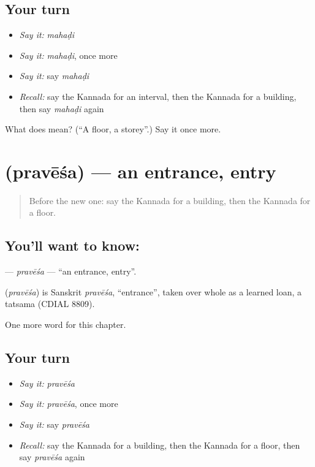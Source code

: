 \subsection*{Your turn}
\begin{itemize}
\raggedright
  \item \emph{Say it:} \emph{mahaḍi}
  \item \emph{Say it:} \emph{mahaḍi}, once more
  \item \emph{Say it:} say \emph{mahaḍi}
  \item \emph{Recall:} say the Kannada for an interval, then the Kannada for a building, then say \emph{mahaḍi} again
\end{itemize}

\begin{tcolorbox}[breakable,colback=teal!4,colframe=teal!35!black,title={Before you move on}]
What does  mean? (\textquotedblleft{}A floor, a storey\textquotedblright{}.) Say it once more.
\end{tcolorbox}
\section[\texorpdfstring{\kn{ಪ್ರವೇಶ} (pravēśa)}{ಪ್ರವೇಶ (pravēśa)}]{ (pravēśa) — an entrance, entry}

\label{lesson:KA-C286-pravesa}



\begin{quote}
Before the new one: say the Kannada for a building, then the Kannada for a floor.
\end{quote}

\subsection*{You'll want to know: }
\textbf{} — \emph{pravēśa} — \textquotedblleft{}an entrance, entry\textquotedblright{}.

\begin{cousinweb}
\textbf{} (\emph{pravēśa}) is Sanskrit \emph{pravēśa}, \textquotedblleft{}entrance\textquotedblright{}, taken over whole as a learned loan, a tatsama (CDIAL 8809).
\end{cousinweb}

\begin{grammarlens}[title={What you've built}]
One more word for this chapter.
\end{grammarlens}

\subsection*{Your turn}
\begin{itemize}
\raggedright
  \item \emph{Say it:} \emph{pravēśa}
  \item \emph{Say it:} \emph{pravēśa}, once more
  \item \emph{Say it:} say \emph{pravēśa}
  \item \emph{Recall:} say the Kannada for a building, then the Kannada for a floor, then say \emph{pravēśa} again
\end{itemize}

